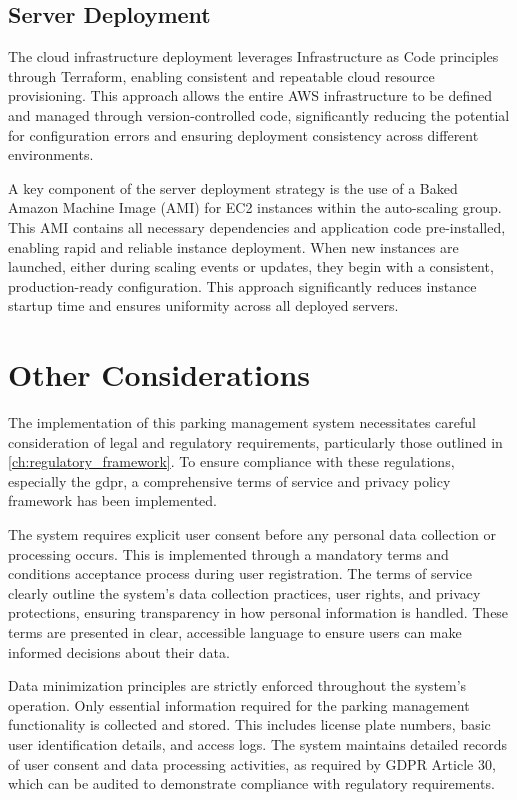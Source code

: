 \subsection{Server Deployment}

The cloud infrastructure deployment leverages Infrastructure as Code principles through Terraform, enabling consistent and repeatable cloud resource provisioning. This approach allows the entire AWS infrastructure to be defined and managed through version-controlled code, significantly reducing the potential for configuration errors and ensuring deployment consistency across different environments.

A key component of the server deployment strategy is the use of a Baked Amazon Machine Image (AMI) for EC2 instances within the auto-scaling group. This AMI contains all necessary dependencies and application code pre-installed, enabling rapid and reliable instance deployment. When new instances are launched, either during scaling events or updates, they begin with a consistent, production-ready configuration. This approach significantly reduces instance startup time and ensures uniformity across all deployed servers.

\section{Other Considerations}

The implementation of this parking management system necessitates careful consideration of legal and regulatory requirements, particularly those outlined in \cref{ch:regulatory_framework}. To ensure compliance with these regulations, especially the \gls{gdpr}, a comprehensive terms of service and privacy policy framework has been implemented.

The system requires explicit user consent before any personal data collection or processing occurs. This is implemented through a mandatory terms and conditions acceptance process during user registration. The terms of service clearly outline the system's data collection practices, user rights, and privacy protections, ensuring transparency in how personal information is handled. These terms are presented in clear, accessible language to ensure users can make informed decisions about their data.

Data minimization principles are strictly enforced throughout the system's operation. Only essential information required for the parking management functionality is collected and stored. This includes license plate numbers, basic user identification details, and access logs. The system maintains detailed records of user consent and data processing activities, as required by GDPR Article 30, which can be audited to demonstrate compliance with regulatory requirements.

